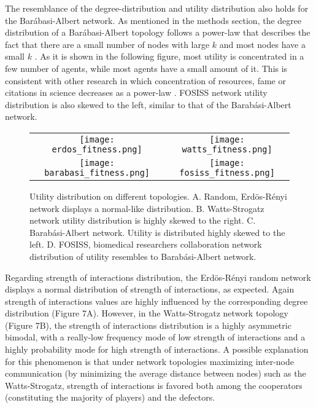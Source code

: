 \documentclass[11pt]{article}
\begin{document}
The resemblance of the degree-distribution and utility distribution also holds
for the Bar\'abasi-Albert network. As mentioned in the methods section, the
degree distribution of a Bar\'abasi-Albert topology follows a power-law that
describes the fact that there are a small number of nodes with large $k$ and most
nodes have a small $k$ \cite{Barabasi1999}. As it is shown in the following
figure, most utility is concentrated in a few number of agents, while most
agents have a small amount of it. This is consistent with other research in
which concentration of resources, fame or citations in science decreases as a
power-law \cite{Simon1955,Price1965,Merton1968}. FOSISS network utility
distribution is also skewed to the left, similar to that of the
Barab\'asi-Albert network. \\ 


\begin{figure} [h!]
\centering
\begin{tabular}{cc}

\texttt{[image: erdos\_fitness.png]} & 
\texttt{[image: watts\_fitness.png]} \\
\texttt{[image: barabasi\_fitness.png]} & 
\texttt{[image: fosiss\_fitness.png]}
\end{tabular}
\caption{Utility distribution on different topologies. A. Random,
  Erd\"{o}s-R\'enyi network displays a normal-like
  distribution. B. Watts-Strogatz network utility distribution is highly skewed
  to the right. C. Barab\'asi-Albert network. Utility is distributed highly
  skewed to the left. D. FOSISS, biomedical researchers collaboration network
  distribution of utility resembles to Barab\'asi-Albert
  network.}\label{histo_fitness} 
\end{figure}

\FloatBarrier

Regarding strength of interactions distribution, the Erd\"{o}s-R\'enyi random
network displays a normal distribution of strength of interactions, as
expected. Again strength of interactions values are highly influenced by the
corresponding degree distribution (Figure 7A). However, in the Watts-Strogatz
network topology (Figure 7B), the strength of interactions distribution is a
highly asymmetric bimodal, with a really-low frequency mode of low strength of
interactions and a highly probability mode for high strength of interactions. A
possible explanation for this phenomenon is that under network topologies
maximizing inter-node communication (by minimizing the average distance between
nodes) such as the Watts-Strogatz, strength of interactions is favored both
among the cooperators (constituting the majority of players) and the
defectors. \\ 
\end{document}
